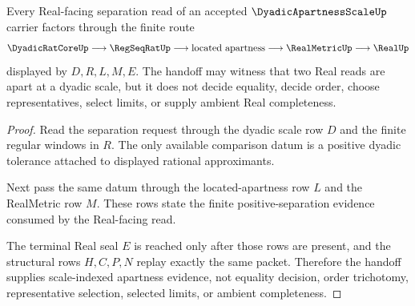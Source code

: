 \begin{theorem}
\label{thm:dyadic-apartness-scale-real-separation-handoff}
Every Real-facing separation read of an accepted $\DyadicApartnessScaleUp$ carrier factors through the finite route
$$
\DyadicRatCoreUp \longrightarrow \RegSeqRatUp \longrightarrow \text{located apartness} \longrightarrow \RealMetricUp \longrightarrow \RealUp
$$
displayed by $D,R,L,M,E$. The handoff may witness that two Real reads are apart at a dyadic scale, but it does not decide equality, decide order, choose representatives, select limits, or supply ambient Real completeness.
\end{theorem}
\begin{proof}
Read the separation request through the dyadic scale row $D$ and the finite regular windows in $R$. The only available comparison datum is a positive dyadic tolerance attached to displayed rational approximants.

Next pass the same datum through the located-apartness row $L$ and the RealMetric row $M$. These rows state the finite positive-separation evidence consumed by the Real-facing read.

The terminal Real seal $E$ is reached only after those rows are present, and the structural rows $H,C,P,N$ replay exactly the same packet. Therefore the handoff supplies scale-indexed apartness evidence, not equality decision, order trichotomy, representative selection, selected limits, or ambient completeness.
\end{proof}




